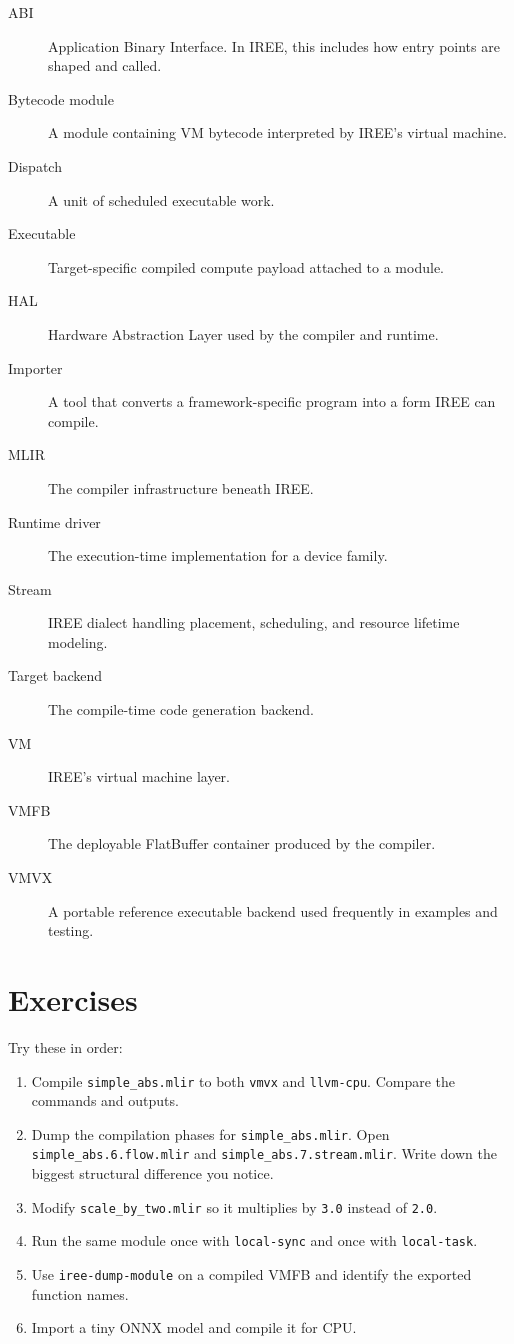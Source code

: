 \documentclass[11pt,a4paper]{article}
\begin{document}
\begin{description}
    \item[ABI] Application Binary Interface. In IREE, this includes how entry points are shaped and called.
    \item[Bytecode module] A module containing VM bytecode interpreted by IREE's virtual machine.
    \item[Dispatch] A unit of scheduled executable work.
    \item[Executable] Target-specific compiled compute payload attached to a module.
    \item[HAL] Hardware Abstraction Layer used by the compiler and runtime.
    \item[Importer] A tool that converts a framework-specific program into a form IREE can compile.
    \item[MLIR] The compiler infrastructure beneath IREE.
    \item[Runtime driver] The execution-time implementation for a device family.
    \item[Stream] IREE dialect handling placement, scheduling, and resource lifetime modeling.
    \item[Target backend] The compile-time code generation backend.
    \item[VM] IREE's virtual machine layer.
    \item[VMFB] The deployable FlatBuffer container produced by the compiler.
    \item[VMVX] A portable reference executable backend used frequently in examples and testing.
\end{description}

\section{Exercises}

Try these in order:

\begin{enumerate}
    \item Compile \texttt{simple\_abs.mlir} to both \texttt{vmvx} and \texttt{llvm-cpu}. Compare the commands and outputs.
    \item Dump the compilation phases for \texttt{simple\_abs.mlir}. Open \texttt{simple\_abs.6.flow.mlir} and \texttt{simple\_abs.7.stream.mlir}. Write down the biggest structural difference you notice.
    \item Modify \texttt{scale\_by\_two.mlir} so it multiplies by \texttt{3.0} instead of \texttt{2.0}.
    \item Run the same module once with \texttt{local-sync} and once with \texttt{local-task}.
    \item Use \texttt{iree-dump-module} on a compiled VMFB and identify the exported function names.
    \item Import a tiny ONNX model and compile it for CPU.
\end{enumerate}
\end{document}
